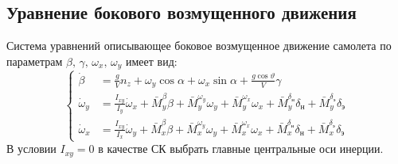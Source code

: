 \documentclass{article}
\begin{document}
\subsection{Уравнение бокового возмущенного движения}
Система уравнений описывающее боковое возмущенное движение самолета по
параметрам $\beta, \, \gamma, \, \omega_x, \, \omega_y$ имеет вид:
\begin{equation}
    \begin{cases}
        \dot{\beta}    & = \frac{g}{V} n_z + \omega_y \cos{\alpha} + \omega_x
        \sin{\alpha} + \frac{g\cos{\vartheta}}{V} \gamma
        \\
        \dot{\omega}_y & = \frac{I_{xy}}{I_y} \dot{\omega}_x + \bar{M}_y^\beta
        \beta + \bar{M}_y^{\omega_y} \omega_y + \bar{M}_y^{\omega_x} \omega_x +
        \bar{M}_y^{\delta_\text{н}} \delta_\text{н} +
        \bar{M}_y^{\delta_\text{э}} \delta_\text{э} \\
        \dot{\omega}_x & = \frac{I_{xy}}{I_x} \dot{\omega}_y + \bar{M}_x^\beta
        \beta + \bar{M}_x^{\omega_y} \omega_y + \bar{M}_x^{\omega_x} \omega_x +
        \bar{M}_x^{\delta_\text{н}} \delta_\text{н} +
        \bar{M}_x^{\delta_\text{э}} \delta_\text{э}
    \end{cases}
\end{equation}
В условии $I_{xy} = 0$ в качестве СК выбрать главные центральные оси инерции.
\end{document}
